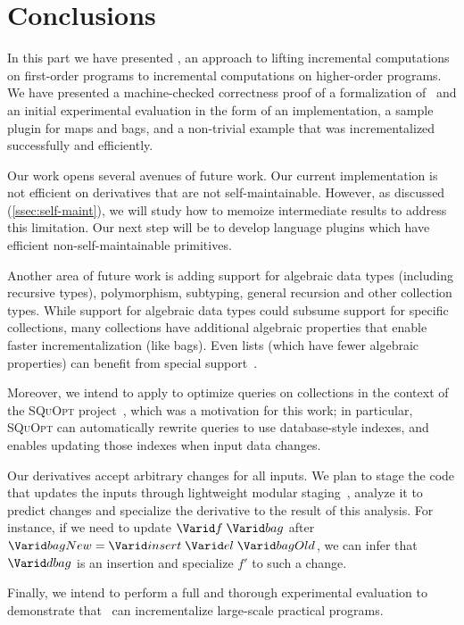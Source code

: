 \chapter{Conclusions}
\label{ssec:future}
In this part we have presented \ILC, an approach to lifting incremental computations
on first-order programs to incremental computations on higher-order
programs. We have presented a machine-checked correctness proof 
of a formalization of \ILC\ and an initial experimental evaluation
in the form of an implementation, a sample plugin for maps and bags,
and a non-trivial example that was incrementalized successfully and
efficiently. 

Our work opens several avenues of future work. Our current implementation
is not efficient on derivatives that are not self-maintainable.
However, as discussed
(\cref{ssec:self-maint}), we will study how
to memoize intermediate results to address this limitation. Our next
step will be to develop language plugins which
have efficient non-self-maintainable primitives.

Another area of future work is adding support for algebraic data
types (including recursive types), polymorphism, subtyping, general recursion
and other collection types. While support for algebraic data
types could subsume support for specific collections, many
collections have additional algebraic properties that enable faster
incrementalization (like bags). Even lists (which have fewer algebraic properties)
can benefit from special support~\citep{Maier2013}.

Moreover, we intend to apply \ILC{} to optimize queries on
collections in the context of the \textsc{SQuOpt}
project~\citep{GiarrussoAOSD13}, which was a motivation for this
work; in particular, \textsc{SQuOpt} can automatically rewrite
queries to use database-style indexes, and \ILC{} enables
updating those indexes when input data changes.

\begin{oldSec}
Our derivatives accept arbitrary changes for all inputs. We plan
to stage the code that updates the inputs through lightweight
modular staging~\citep{rompf2010lightweight}, analyze it to
predict changes and specialize the derivative to the result of
this analysis. For instance, if we need to update $\Term{f} \;
\Term{bag}$ after $\Term{bagNew} = \Term{insert} \; \Term{el} \;
\Term{bagOld}$, we can infer that $\Term{dbag}$ is an insertion
and specialize $f'$ to such a change.
\end{oldSec}

Finally, we intend to perform a full and thorough experimental evaluation
to demonstrate that \ILC\ can incrementalize large-scale practical programs.
